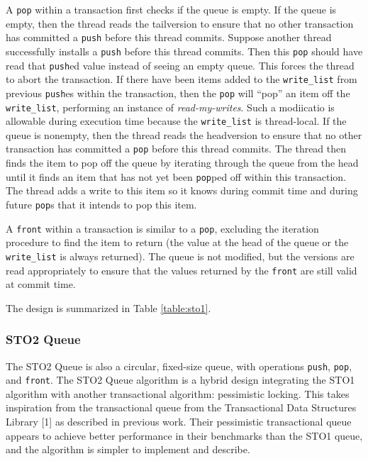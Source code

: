 A \texttt{pop} within a transaction first checks if the queue is empty. If the queue is empty, then the thread reads the tailversion to ensure that no other transaction has committed a \texttt{push} before this thread commits. Suppose another thread successfully installs a \texttt{push} before this thread commits. Then this \texttt{pop} should have read that \texttt{push}ed value instead of seeing an empty queue. This forces the thread to abort the transaction. If there have been items added to the \texttt{write\_list} from previous \texttt{push}es within the transaction, then the \texttt{pop} will “pop” an item off the \texttt{write\_list}, performing an instance of \emph{read-my-writes}. Such a modiicatio is allowable during execution time because the \texttt{write\_list} is thread-local. If the queue is nonempty, then the thread reads the headversion to ensure that no other transaction has committed a \texttt{pop} before this thread commits. The thread then finds the item to pop off the queue by iterating through the queue from the head until it finds an item that has not yet been \texttt{pop}ped off within this transaction. The thread adds a write to this item so it knows during commit time and during future \texttt{pop}s that it intends to pop this item.

A \texttt{front} within a transaction is similar to a \texttt{pop}, excluding the iteration procedure to find the item to return (the value at the head of the queue or the \texttt{write\_list} is always returned). The queue is not modified, but the versions are read appropriately to ensure that the values returned by the \texttt{front} are still valid at commit time.

The design is summarized in Table \ref{table:sto1}.

\subsubsection{STO2 Queue}

The STO2 Queue is also a circular, fixed-size queue, with operations \texttt{push}, \texttt{pop}, and \texttt{front}. The STO2 Queue algorithm is a hybrid design integrating the STO1 algorithm with another transactional algorithm: pessimistic locking. This takes inspiration from the transactional queue from the Transactional Data Structures Library [1] as described in previous work. Their pessimistic transactional queue appears to achieve better performance in their benchmarks than the STO1 queue, and the algorithm is simpler to implement and describe. 

